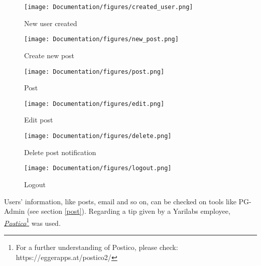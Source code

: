\begin{figure}[htbp]
	\centering
	
	\begin{minipage}[b]{0.45\textwidth}
		\centering
		\texttt{[image: Documentation/figures/created\_user.png]}
		\caption{New user created}
		\label{fig:user}
	\end{minipage}
	\hfill
	\begin{minipage}[b]{0.45\textwidth}
		\centering
		\texttt{[image: Documentation/figures/new\_post.png]}
		\caption{Create new post}
		\label{fig:np}
	\end{minipage}

\end{figure}


\begin{figure}[htbp]
	\centering
	
	\begin{minipage}[b]{0.45\textwidth}
		\centering
		\texttt{[image: Documentation/figures/post.png]}
		\caption{Post}
		\label{fig:post}
	\end{minipage}
	\hfill
	\begin{minipage}[b]{0.45\textwidth}
		\centering
		\texttt{[image: Documentation/figures/edit.png]}
		\caption{Edit post}
		\label{fig:edit}
	\end{minipage}

\end{figure}

\begin{figure}[htbp]
	\centering
	
	\begin{minipage}[b]{0.45\textwidth}
		\centering
		\texttt{[image: Documentation/figures/delete.png]}
		\caption{Delete post notification}
		\label{fig:delete}
	\end{minipage}
	\hfill
	\begin{minipage}[b]{0.45\textwidth}
		\centering
		\texttt{[image: Documentation/figures/logout.png]}
		\caption{Logout}
		\label{fig:logout}
	\end{minipage}

\end{figure}



Users' information, like posts, email and so on, can be checked on tools like PG-Admin (see section \ref{post}). Regarding a tip given by a Yarilabs employee, \href{https://eggerapps.at/postico2/}{\textit{Postico}}\footnote{For a further understanding of Postico, please check: https://eggerapps.at/postico2/} was used.

